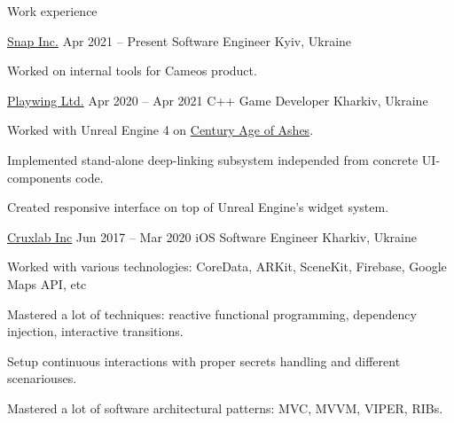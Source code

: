 \newenvironment{work}[5]{ %
    \begin{rSubsection}
        {\href{#2}{#1}}
        {#3}
        {#4}
        {#5}
}{
    \end{rSubsection}
}

\begin{cvsection}{Work experience}
\begin{work}
{Snap Inc.}
{https://snap.com}
{Apr 2021 -- Present}
{Software Engineer}
{Kyiv, Ukraine}
	\item Worked on internal tools for Cameos product.
\end{work}

\begin{work}
{Playwing Ltd.}
{https://playwing.com}
{Apr 2020 -- Apr 2021}
{C++ Game Developer}
{Kharkiv, Ukraine}
	\item Worked with Unreal Engine 4 on \href{https://www.century-age-of-ashes.com/}{Century Age of Ashes}.
	\item Implemented stand-alone deep-linking subsystem independed from concrete UI-components code.
	\item Created responsive interface on top of Unreal Engine's widget system.
\end{work}

\begin{work}
{Cruxlab Inc}
{https://cruxlab.com/}
{Jun 2017 -- Mar 2020}
{iOS Software Engineer}
{Kharkiv, Ukraine}
	\item Worked with various technologies: CoreData, ARKit, SceneKit, Firebase, Google Maps API, etc
	\item Mastered a lot of techniques: reactive functional programming, dependency injection, interactive transitions.
	\item Setup continuous interactions with proper secrets handling and different scenariouses.
	\item Mastered a lot of software architectural patterns: MVC, MVVM, VIPER, RIBs.
\end{work}
\end{cvsection}
